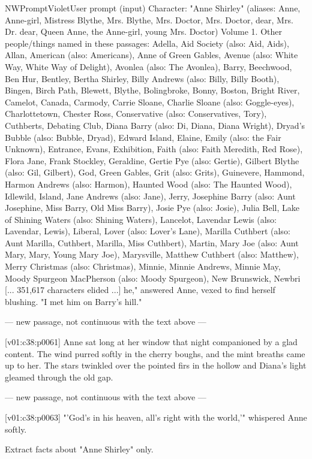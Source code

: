 \begin{nwprompt}{NWPromptViolet}{User prompt (input)}
Character: "Anne Shirley" (aliases: Anne, Anne-girl, Mistress Blythe, Mrs. Blythe, Mrs. Doctor, Mrs. Doctor, dear, Mrs. Dr. dear, Queen Anne, the Anne-girl, young Mrs. Doctor)
Volume 1.
Other people/things named in these passages: Adella, Aid Society (also: Aid, Aids), Allan, American (also: Americans), Anne of Green Gables, Avenue (also: White Way, White Way of Delight), Avonlea (also: The Avonlea), Barry, Beechwood, Ben Hur, Bentley, Bertha Shirley, Billy Andrews (also: Billy, Billy Booth), Bingen, Birch Path, Blewett, Blythe, Bolingbroke, Bonny, Boston, Bright River, Camelot, Canada, Carmody, Carrie Sloane, Charlie Sloane (also: Goggle-eyes), Charlottetown, Chester Ross, Conservative (also: Conservatives, Tory), Cuthberts, Debating Club, Diana Barry (also: Di, Diana, Diana Wright), Dryad's Bubble (also: Bubble, Dryad), Edward Island, Elaine, Emily (also: the Fair Unknown), Entrance, Evans, Exhibition, Faith (also: Faith Meredith, Red Rose), Flora Jane, Frank Stockley, Geraldine, Gertie Pye (also: Gertie), Gilbert Blythe (also: Gil, Gilbert), God, Green Gables, Grit (also: Grits), Guinevere, Hammond, Harmon Andrews (also: Harmon), Haunted Wood (also: The Haunted Wood), Idlewild, Island, Jane Andrews (also: Jane), Jerry, Josephine Barry (also: Aunt Josephine, Miss Barry, Old Miss Barry), Josie Pye (also: Josie), Julia Bell, Lake of Shining Waters (also: Shining Waters), Lancelot, Lavendar Lewis (also: Lavendar, Lewis), Liberal, Lover (also: Lover's Lane), Marilla Cuthbert (also: Aunt Marilla, Cuthbert, Marilla, Miss Cuthbert), Martin, Mary Joe (also: Aunt Mary, Mary, Young Mary Joe), Marysville, Matthew Cuthbert (also: Matthew), Merry Christmas (also: Christmas), Minnie, Minnie Andrews, Minnie May, Moody Spurgeon MacPherson (also: Moody Spurgeon), New Brunswick, Newbri
[... 351,617 characters elided ...]
he," answered Anne, vexed to find herself blushing. "I met him on Barry's hill."

--- new passage, not continuous with the text above ---

[v01:c38:p0061] Anne sat long at her window that night companioned by a glad content. The wind purred softly in the cherry boughs, and the mint breaths came up to her. The stars twinkled over the pointed firs in the hollow and Diana's light gleamed through the old gap.

--- new passage, not continuous with the text above ---

[v01:c38:p0063] "'God's in his heaven, all's right with the world,'" whispered Anne softly.

Extract facts about "Anne Shirley" only.
\end{nwprompt}

